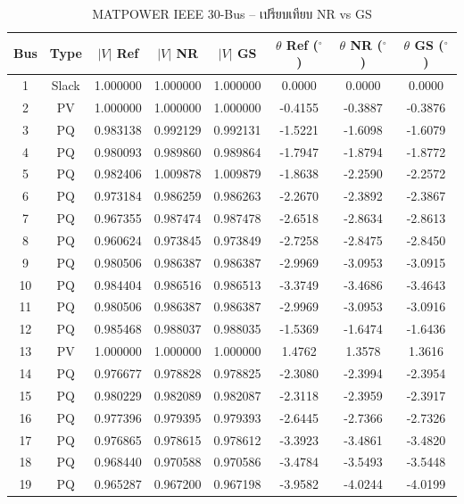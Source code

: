 \documentclass[12pt,a4paper]{article}
\begin{document}
\begin{table}[H]
\centering
\caption{MATPOWER IEEE 30-Bus -- เปรียบเทียบ NR vs GS}
\footnotesize
\begin{tabular}{cccccccc}
\toprule
\textbf{Bus} & \textbf{Type} & \textbf{$|V|$ Ref} & \textbf{$|V|$ NR} & \textbf{$|V|$ GS} & \textbf{$\theta$ Ref ($^\circ$)} & \textbf{$\theta$ NR ($^\circ$)} & \textbf{$\theta$ GS ($^\circ$)} \\
\midrule
1  & Slack & 1.000000 & 1.000000 & 1.000000 &  0.0000 &  0.0000 &  0.0000 \\
2  & PV    & 1.000000 & 1.000000 & 1.000000 & -0.4155 & -0.3887 & -0.3876 \\
3  & PQ    & 0.983138 & 0.992129 & 0.992131 & -1.5221 & -1.6098 & -1.6079 \\
4  & PQ    & 0.980093 & 0.989860 & 0.989864 & -1.7947 & -1.8794 & -1.8772 \\
5  & PQ    & 0.982406 & 1.009878 & 1.009879 & -1.8638 & -2.2590 & -2.2572 \\
6  & PQ    & 0.973184 & 0.986259 & 0.986263 & -2.2670 & -2.3892 & -2.3867 \\
7  & PQ    & 0.967355 & 0.987474 & 0.987478 & -2.6518 & -2.8634 & -2.8613 \\
8  & PQ    & 0.960624 & 0.973845 & 0.973849 & -2.7258 & -2.8475 & -2.8450 \\
9  & PQ    & 0.980506 & 0.986387 & 0.986387 & -2.9969 & -3.0953 & -3.0915 \\
10 & PQ    & 0.984404 & 0.986516 & 0.986513 & -3.3749 & -3.4686 & -3.4643 \\
11 & PQ    & 0.980506 & 0.986387 & 0.986387 & -2.9969 & -3.0953 & -3.0916 \\
12 & PQ    & 0.985468 & 0.988037 & 0.988035 & -1.5369 & -1.6474 & -1.6436 \\
13 & PV    & 1.000000 & 1.000000 & 1.000000 &  1.4762 &  1.3578 &  1.3616 \\
14 & PQ    & 0.976677 & 0.978828 & 0.978825 & -2.3080 & -2.3994 & -2.3954 \\
15 & PQ    & 0.980229 & 0.982089 & 0.982087 & -2.3118 & -2.3959 & -2.3917 \\
16 & PQ    & 0.977396 & 0.979395 & 0.979393 & -2.6445 & -2.7366 & -2.7326 \\
17 & PQ    & 0.976865 & 0.978615 & 0.978612 & -3.3923 & -3.4861 & -3.4820 \\
18 & PQ    & 0.968440 & 0.970588 & 0.970586 & -3.4784 & -3.5493 & -3.5448 \\
19 & PQ    & 0.965287 & 0.967200 & 0.967198 & -3.9582 & -4.0244 & -4.0199 \\

\end{tabular}
\end{table}
\end{document}
